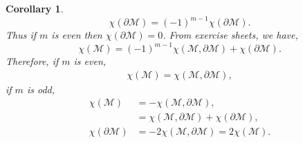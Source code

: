 \documentclass[10pt]{article}
\newtheorem{corollary}{Corollary} [section]
\newcommand{\M}[0]{\mathcal{M}}
\begin{document}
\begin{corollary}
  \begin{equation*}
    \chi(\partial\M) = (-1)^{m-1}\chi(\partial\M). 
  \end{equation*}
  Thus if $m$ is even then $\chi(\partial\M)=0$. From exercise sheets, we have,
  \begin{equation*}
    \chi(\M)=(-1)^{m-1}\chi(\M,\partial\M)+\chi(\partial\M).
  \end{equation*}
  Therefore, if $m$ is even,
  \begin{align*}
      \chi(\M)=\chi(\M,\partial\M),
  \end{align*}
  if $m$ is odd, 
  \begin{align*}
    \chi(\M)&=-\chi(\M,\partial\M),\\
    & = \chi(\M,\partial\M)+\chi(\partial\M),\\
    \chi(\partial\M)&=-2\chi(\M,\partial\M)=2\chi(\M).
  \end{align*}
\end{corollary}
\end{document}

